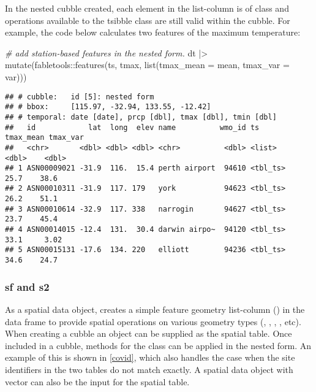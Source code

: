\documentclass{article}
\newenvironment{Shaded}{\begin{snugshade}}{\end{snugshade}}
\newcommand{\AttributeTok}[1]{\textcolor[rgb]{0.77,0.63,0.00}{#1}}
\newcommand{\CommentTok}[1]{\textcolor[rgb]{0.56,0.35,0.01}{\textit{#1}}}
\newcommand{\FunctionTok}[1]{\textcolor[rgb]{0.00,0.00,0.00}{#1}}
\newcommand{\NormalTok}[1]{#1}
\newcommand{\SpecialCharTok}[1]{\textcolor[rgb]{0.00,0.00,0.00}{#1}}
\begin{document}
In the nested cubble created, each element in the list-column  is of  class and operations available to the tsibble class are still valid within the cubble. For example, the code below calculates two features of the maximum temperature:

\begin{Shaded}
\begin{Highlighting}[]
\CommentTok{\# add station{-}based features in the nested form.}
\NormalTok{dt }\SpecialCharTok{|\textgreater{}} \FunctionTok{mutate}\NormalTok{(fabletools}\SpecialCharTok{::}\FunctionTok{features}\NormalTok{(ts, tmax, }\FunctionTok{list}\NormalTok{(}\AttributeTok{tmax\_mean =}\NormalTok{ mean, }\AttributeTok{tmax\_var =}\NormalTok{ var)))}
\end{Highlighting}
\end{Shaded}

\begin{verbatim}
## # cubble:   id [5]: nested form
## # bbox:     [115.97, -32.94, 133.55, -12.42]
## # temporal: date [date], prcp [dbl], tmax [dbl], tmin [dbl]
##   id            lat  long  elev name          wmo_id ts       tmax_mean tmax_var
##   <chr>       <dbl> <dbl> <dbl> <chr>          <dbl> <list>       <dbl>    <dbl>
## 1 ASN00009021 -31.9  116.  15.4 perth airport  94610 <tbl_ts>      25.7    38.6 
## 2 ASN00010311 -31.9  117. 179   york           94623 <tbl_ts>      26.2    51.1 
## 3 ASN00010614 -32.9  117. 338   narrogin       94627 <tbl_ts>      23.7    45.4 
## 4 ASN00014015 -12.4  131.  30.4 darwin airpo~  94120 <tbl_ts>      33.1     3.02
## 5 ASN00015131 -17.6  134. 220   elliott        94236 <tbl_ts>      34.6    24.7
\end{verbatim}

\hypertarget{sf-and-s2}{%
\subsubsection{sf and s2}\label{sf-and-s2}}

As a spatial data object,  creates a simple feature geometry list-column () in the data frame to provide spatial operations on various geometry types (, , , , etc). When creating a cubble an  object can be supplied as the spatial table. Once included in a cubble, methods for the  class can be applied in the nested form. An example of this is shown in \ref{covid}, which also handles the case when the site identifiers in the two tables do not match exactly. A spatial data object with  vector can also be the input for the spatial table.
\end{document}
